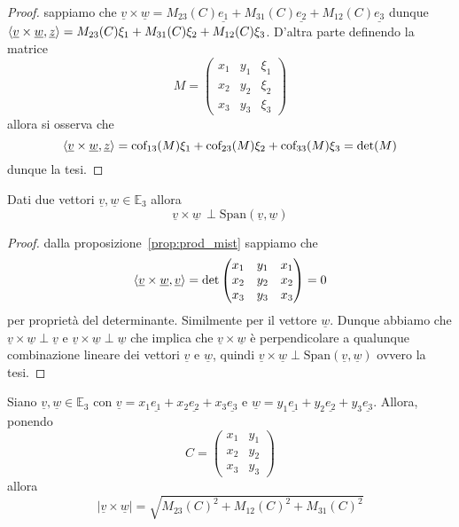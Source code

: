 \begin{proof}
	sappiamo che $\underline{v} \times \underline{w} = M_{23}(C)\underline{e_1} + M_{31}(C) \underline{e_2} + M_{12}(C) \underline{e_3}$ dunque $\langle \underline{v} \times \underline{w}, \underline{z} \rangle = M_{23}(C)\xi_1 + M_{31}(C)\xi_2 + M_{12}(C)\xi_3$. D'altra parte definendo la matrice 
	$$M=\begin{pmatrix}
		x_1 & y_1 & \xi_1 \\
		x_2 & y_2 & \xi_2 \\
		x_3 & y_3 & \xi_3
	\end{pmatrix} 
$$
allora si osserva che
$$
\langle \underline{v} \times \underline{w}, \underline{z} \rangle = \text{cof}_{13}(M)\xi_1 + \text{cof}_{23}(M)\xi_2 + \text{cof}_{33}(M) \xi_3 = \text{det}(M)
$$
dunque la tesi.
\end{proof}
\begin{cor}
Dati due vettori $\underline{v}, \underline{w} \in \mathbb{E}_3$ allora
$$
\underline{v} \times \underline{w} \, \perp \text{Span}(\underline{v}, \underline{w})
$$
\end{cor}
\begin{proof}
dalla proposizione~\ref{prop:prod_mist} sappiamo che
$$
\langle \underline{v} \times \underline{w}, \underline{v} \rangle = \text{det}\begin{pmatrix}
	x_1 & y_1 & x_1 \\
	x_2 & y_2 & x_2 \\
	x_3 & y_3 & x_3
\end{pmatrix} = 0
$$
per proprietà del determinante. Similmente per il vettore $\underline{w}$. Dunque abbiamo che $\underline{v} \times \underline{w} \perp \underline{v}$ e $\underline{v} \times \underline{w} \perp \underline{w}$ che implica che $\underline{v} \times \underline{w}$ è perpendicolare a qualunque combinazione lineare dei vettori $\underline{v}$ e $\underline{w}$, quindi $\underline{v} \times \underline{w} \perp \text{Span}(\underline{v}, \underline{w})$ ovvero la tesi.
\end{proof}
\begin{cor}
Siano $\underline{v}, \underline{w} \in \mathbb{E}_3$ con $\underline{v} = x_1 \underline{e_1} + x_2 \underline{e_2} + x_3 \underline{e_3}$ e $\underline{w} = y_1 \underline{e_1} + y_2 \underline{e_2} + y_3 \underline{e_3}$. Allora, ponendo
$$
C = \begin{pmatrix}
	x_1 & y_1 \\
	x_2 & y_2 \\
	x_3 & y_3 
\end{pmatrix}
$$
allora
$$
|\underline{v} \times \underline{w}| = \sqrt{M_{23}(C)^2 + M_{12}(C)^2 + M_{31}(C)^2} 
$$
\label{cor:norm_cross_prod}
\end{cor}
